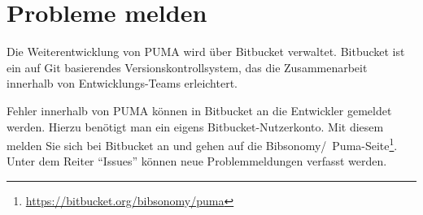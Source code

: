 \section{Probleme melden}
\label{sec:bitbucket}
Die Weiterentwicklung von PUMA wird über Bitbucket verwaltet. Bitbucket ist ein auf Git basierendes Versionskontrollsystem, das die Zusammenarbeit innerhalb von Entwicklungs-Teams erleichtert.  

Fehler innerhalb von PUMA können in Bitbucket an die Entwickler gemeldet werden. Hierzu benötigt man ein eigens Bitbucket-Nutzerkonto. Mit diesem melden Sie sich bei Bitbucket an und gehen auf die Bibsonomy/~Puma-Seite\footnote{\url{https://bitbucket.org/bibsonomy/puma}}. Unter dem Reiter \enquote{Issues} können neue Problemmeldungen verfasst werden.

